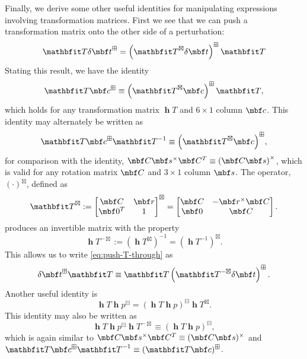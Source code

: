 \documentclass[11pt,a4,oneside]{article}
\begin{document}
Finally, we derive some other useful identities for manipulating expressions involving transformation matrices. First we see that we can push a transformation matrix onto the other side of a perturbation:
\begin{equation}
  \label{eq:derive-boxtimes}
  \mbfh T \mbfdel t^\boxplus =
  \left(\mbfh T^\boxtimes \mbfdel t \right)^\boxplus \mbfh T
\end{equation}
Stating this result, we have the identity
\begin{equation}
  \label{eq:push-T-through}
  {\mbfh T \mbf c^\boxplus \equiv \left(\mbfh T^\boxtimes \mbf c\right)^\boxplus \mbfh T},
\end{equation}
which holds for any transformation matrix $\mbfh T$ and $6 \times 1$ column $\mbf c$. This identity may alternately be written as 
\begin{equation}
  {\mbfh T \mbf c^\boxplus \mbfh T^{-1} \equiv \left(\mbfh T^\boxtimes \mbf c\right)^\boxplus},\label{eq:F-matrix}
\end{equation}
for comparison with the identity, $\mbf C \mbf s^\times \mbf C^T \equiv \left( \mbf C \mbf s \right)^\times$, which is valid for any rotation matrix $\mbf C$ and $3 \times 1$ column $\mbf s$.
The operator, $(\cdot)^{\boxtimes}$, defined as
\begin{equation}
  \mbfh T^{\boxtimes} :=
  \bbm
    \mbf C   & \mbf r \\
    \mbf 0^T & 1
  \ebm^\boxtimes
  =
  \bbm
    \mbf C & -\mbf r^\times \mbf C \\
    \mbf 0    & \mbf C
  \ebm.
\end{equation}
produces an invertible matrix with the property
\begin{equation}
  \mbfh T^{-\boxtimes}:=\left(\mbfh T^\boxtimes \right)^{-1} = \left( \mbfh T^{-1}\right)^\boxtimes.
\end{equation}
This allows us to write \eqref{eq:push-T-through} as
\begin{equation}
  \label{eq:push-T-through2}
  \mbfdel t^\boxplus \mbfh T \equiv \mbfh T \left( \mbfh T^{-\boxtimes} \mbfdel t\right)^\boxplus.
\end{equation}
Another useful identity is
\begin{equation}
  \mbfh T \mbfh p^\boxminus = \left( \mbfh T \mbfh p \right)^\boxminus \mbfh T^\boxtimes .
\end{equation}
This identity
may also be written as
\begin{equation}
  \label{eq:push-T-through-p-2}
\mbfh T \mbfh p^\boxminus \mbfh T^{-\boxtimes} \equiv \left( \mbfh T \mbfh p \right)^\boxminus,
\end{equation}
which is again similar to $\mbf C \mbf s^\times \mbf C^T \equiv (\mbf C \mbf s)^\times$ and $\mbfh T \mbf c^\boxplus \mbfh T^{-1} \equiv (\mbfh T \mbf c)^\boxplus$.
\end{document}
